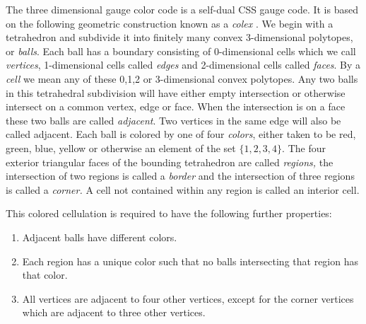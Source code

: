 %

The three dimensional gauge color code \cite{Bombin2015,Bombin2015single}
is a self-dual CSS gauge code. 
It is based on the following geometric construction known
as a \emph{colex} \cite{Bombin2007exact}.
We begin with a tetrahedron and subdivide it into finitely many
convex 3-dimensional polytopes, or \emph{balls}.
Each ball has a boundary consisting of 0-dimensional cells
which we call \emph{vertices}, 1-dimensional cells called \emph{edges}
and 2-dimensional cells called \emph{faces}.
By a \emph{cell} we mean any of these 0,1,2 or 3-dimensional convex polytopes.
Any two balls in this tetrahedral subdivision will
have either empty intersection or otherwise intersect
on a common vertex, edge or face.
When the intersection is on a face these two balls
are called \emph{adjacent}.
Two vertices in the same edge will also be called adjacent.
Each ball is colored by one of four \emph{colors},
either taken to be red, green, blue, yellow or 
otherwise an element of the set $\{1, 2, 3, 4\}.$
The four exterior triangular faces of the bounding tetrahedron are
called \emph{regions,} the intersection of two regions is called
a \emph{border} and the intersection of three regions is called
a \emph{corner.}
A cell not contained within any region is called an interior cell.

This colored cellulation is required to have the following further properties:
\begin{enumerate}
\item Adjacent balls have different colors.
\item Each region has a unique color 
such that no balls intersecting that region has that color.
\item All vertices are adjacent to four other vertices,
except for the corner vertices which are adjacent to three other vertices.
\end{enumerate}

